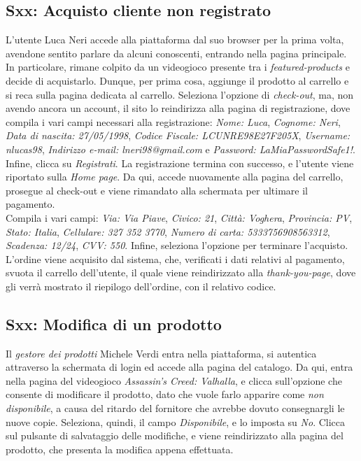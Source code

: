 \documentclass[12pt, a4paper, oneside]{book}
\begin{document}
    \subsection*{Sxx: Acquisto cliente non registrato}
    L'utente Luca Neri accede alla piattaforma dal suo browser per la prima volta, avendone sentito parlare da alcuni conoscenti, entrando nella pagina principale. In particolare, rimane colpito da un videogioco presente tra i \textit{featured-products} e decide di acquistarlo. Dunque, per prima cosa, aggiunge il prodotto al carrello e si reca sulla pagina dedicata al carrello. Seleziona l'opzione di \textit{check-out}, ma, non avendo ancora un account, il sito lo reindirizza alla pagina di registrazione, dove compila i vari campi necessari alla registrazione: \textit{Nome: Luca}, \textit{Cognome: Neri}, \textit{Data di nascita: 27/05/1998}, \textit{Codice Fiscale: LCUNRE98E27F205X}, \textit{Username: nlucas98}, \textit{Indirizzo e-mail: lneri98@gmail.com} e \textit{Password: LaMiaPasswordSafe1!}. Infine, clicca su \textit{Registrati}. La registrazione termina con successo, e l'utente viene riportato sulla \textit{Home page}. Da qui, accede nuovamente alla pagina del carrello, prosegue al check-out e viene rimandato alla schermata per ultimare il pagamento.\\
    Compila i vari campi: \textit{Via: Via Piave}, \textit{Civico: 21}, \textit{Città: Voghera}, \textit{Provincia: PV}, \textit{Stato: Italia}, \textit{Cellulare: 327 352 3770}, \textit{Numero di carta: 5333756908563312}, \textit{Scadenza: 12/24}, \textit{CVV: 550}. Infine, seleziona l'opzione per terminare l'acquisto.\\
    L'ordine viene acquisito dal sistema, che, verificati i dati relativi al pagamento, svuota il carrello dell'utente, il quale viene reindirizzato alla \textit{thank-you-page}, dove gli verrà mostrato il riepilogo dell'ordine, con il relativo codice.

    \subsection*{Sxx: Modifica di un prodotto}
    Il \textit{gestore dei prodotti} Michele Verdi entra nella piattaforma, si autentica attraverso la schermata di login ed accede alla pagina del catalogo. Da qui, entra nella pagina del videogioco \textit{Assassin's Creed: Valhalla}, e clicca sull'opzione che consente di modificare il prodotto, dato che vuole farlo apparire come \textit{non disponibile}, a causa del ritardo del fornitore che avrebbe dovuto consegnargli le nuove copie. Seleziona, quindi, il campo \textit{Disponibile}, e lo imposta su \textit{No}. Clicca sul pulsante di salvataggio delle modifiche, e viene reindirizzato alla pagina del prodotto, che presenta la modifica appena effettuata.
\end{document}
